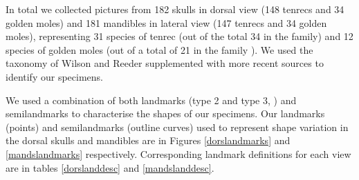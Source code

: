 \documentclass[12pt,a4paper]{article}
\begin{document}
In total we collected pictures from 182 skulls in dorsal view (148 tenrecs and 34 golden moles) and 181 mandibles in lateral view (147 tenrecs and 34 golden moles), representing 31 species of tenrec (out of the total 34 in the family) and 12 species of golden moles (out of a total of 21 in the family \citep{Asher2010}). We used the taxonomy of Wilson and Reeder \citeyearpar{Wilson2005} supplemented with more recent sources \citep{IUCN2012, Olson2013} to identify our specimens. 
	

We used a combination of both landmarks (type 2 and type 3, \citep{Zelditch2012}) and semilandmarks to characterise the shapes of our specimens. Our landmarks (points) and semilandmarks (outline curves) used to represent shape variation in the dorsal skulls and mandibles are in Figures \ref{dorslandmarks} and \ref{mandslandmarks} respectively. Corresponding landmark definitions for each view are in tables \ref{dorslanddesc} and \ref{mandslanddesc}.


	
\end{document}
